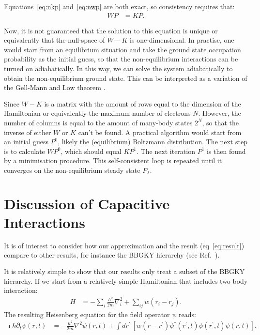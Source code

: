 Equations~\ref{eq:nkp} and~\ref{eq:nwp} are both exact, so consistency requires that:
\begin{align}
WP &= KP. \label{eq:selfconsistency}
\end{align}

Now, it is not guaranteed that the solution to this equation is unique or equivalently that the null-space of $W-K$ is one-dimensional. In practise, one would start from an equilibrium situation and take the ground state occupation probability as the initial guess, so that the non-equilibrium interactions can be turned on adiabatically. In this way, we can solve the system adiabatically to obtain the non-equilibrium ground state. This can be interpreted as a variation of the Gell-Mann and Low theorem \cite{gellmannlow, molinari}.

Since $W-K$ is a matrix with the amount of rows equal to the dimension of the Hamiltonian or equivalently the maximum number of electrons $N$. However, the number of columns is equal to the amount of many-body states $2^N$, so that the inverse of either $W$ or $K$ can't be found. A practical algorithm would start from an initial guess $P^0$, likely the (equilibrium) Boltzmann distribution. The next step is to calculate $WP^0$, which should equal $KP^1$. The next iteration $P^1$ is then found by a minimisation procedure. This self-consistent loop is repeated until it converges on the non-equilibrium steady state $P_\lambda$.



\section{Discussion of Capacitive Interactions}
\label{sec:discussioncapacitive}
It is of interest to consider how our approximation and the result (eq~\ref{eq:result}) compare to other results, for instance the BBGKY hierarchy (see Ref.~\cite{diventra}).

It is relatively simple to show that our results only treat a subset of the BBGKY hierarchy. If we start from a relatively simple Hamiltonian that includes two-body interaction:
\begin{align*}
H &= -\sum_i \frac{\hbar^2}{2m} \nabla_i^2 + \sum_{ij} w(r_i - r_j).
\end{align*}
The resulting Heisenberg equation for the field operator $\psi$ reads:
\begin{align*}
\imath\hbar\partial_t \psi(r, t) &= -\frac{\hbar^2}{2m} \nabla^2 \psi(r,t) + \int dr^\prime \: \left[ w(r-r^\prime) \psi^\dagger (r^\prime, t) \psi(r^\prime,t) \psi(r,t)\right].
\end{align*}

